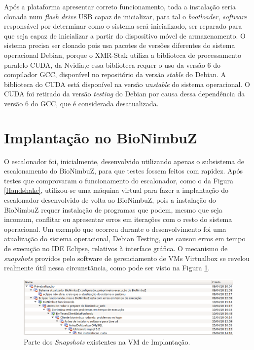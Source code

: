 Após a plataforma apresentar correto funcionamento, toda a instalação seria clonada num \textit{flash drive} \acrshort{USB} capaz de inicializar, para tal o \textit{bootloader}, \textit{software} responsável por determinar como o sistema será inicializado, ser reparado para que seja capaz de inicializar a partir do dispositivo móvel de armazenamento. O sistema precisa ser clonado pois usa pacotes de versões diferentes do sistema operacional Debian\cite{Debian}, porque o XMR-Stak utiliza a biblioteca de processamento paralelo \acrshort{CUDA}\cite{CUDA}, da Nvidia\cite{NVIDIA},e essa biblioteca requer o uso da versão 6 do compilador \acrshort{GCC}\cite{GCC}, disponível no repositório da versão \textit{stable} do Debian. A biblioteca do CUDA está disponível na versão \textit{unstable} do sistema operacional. O \acrshort{CUDA} foi retirado da versão \textit{testing} do Debian por causa dessa dependência da versão 6 do \acrshort{GCC}, que é considerada desatualizada\cite{CUDA_BUGREP}.


\section{Implantação no BioNimbuZ}

O escalonador foi, inicialmente, desenvolvido utilizando apenas o subsistema de escalonamento do BioNimbuZ, para que testes fossem feitos com rapidez. Após testes que comprovaram o funcionamento do escalonador, como o da Figura \ref{Handshake}, utilizou-se uma máquina virtual para fazer a implantação do escalonador desenvolvido de volta ao BioNimbuZ, pois a instalação do BioNimbuZ requer instalação de programas que podem, mesmo que seja incomum, conflitar ou apresentar erros em iterações com o resto do sistema operacional. Um exemplo que ocorreu durante o desenvolvimento foi uma atualização do sistema operacional, Debian\cite{Debian} Testing\cite{DebianTesting}, que causou erros em tempo de execução no \acrfull{IDE} Eclipse\cite{JavaEclipse}, relativos à interface gráfica. O mecanismo de \textit{snapshots} providos pelo software de gerenciamento de \acrshort{VM}s Virtualbox\cite{VirtualBox} se revelou realmente útil nessa circunstância, como pode ser visto na Figura \ref{Snapshots}.

\begin{figure}[htbp]
	\centerline{\includegraphics[width=12cm]{img/Snapshots.png}}
	\caption{Parte dos \textit{Snapshots} existentes na \acrshort{VM} de Implantação.}
	\label{Snapshots}
\end{figure}

